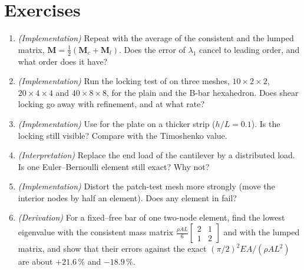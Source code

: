 \section*{Exercises}\label{sec:el-exercises}
\begin{enumerate}
\item \emph{(Implementation)} Repeat  with the average of the consistent and the lumped matrix, $\bm M=\tfrac12(\bm M_c+\bm M_l)$. Does the error of $\lambda_1$ cancel to leading order, and what order does it have?
\item \emph{(Implementation)} Run the locking test of  on three meshes, $10\times2\times2$, $20\times4\times4$ and $40\times8\times8$, for the plain and the B-bar hexahedron. Does shear locking go away with refinement, and at what rate?
\item \emph{(Implementation)} Use  for the plate on a thicker strip ($h/L=0.1$). Is the locking still visible? Compare with the Timoshenko value.
\item \emph{(Interpretation)} Replace the end load of the cantilever by a distributed load. Is one Euler--Bernoulli element still exact? Why not?
\item \emph{(Implementation)} Distort the patch-test mesh more strongly (move the interior nodes by half an element). Does any element in  fail?
\item \emph{(Derivation)} For a fixed--free bar of one two-node element, find the lowest eigenvalue with the consistent mass matrix $\tfrac{\rho AL}{6}\left[\begin{smallmatrix}2&1\\1&2\end{smallmatrix}\right]$ and with the lumped matrix, and show that their errors against the exact $(\pi/2)^2EA/(\rho AL^2)$ are about $+21.6\,\%$ and $-18.9\,\%$.
\end{enumerate}

\chapterrefs
